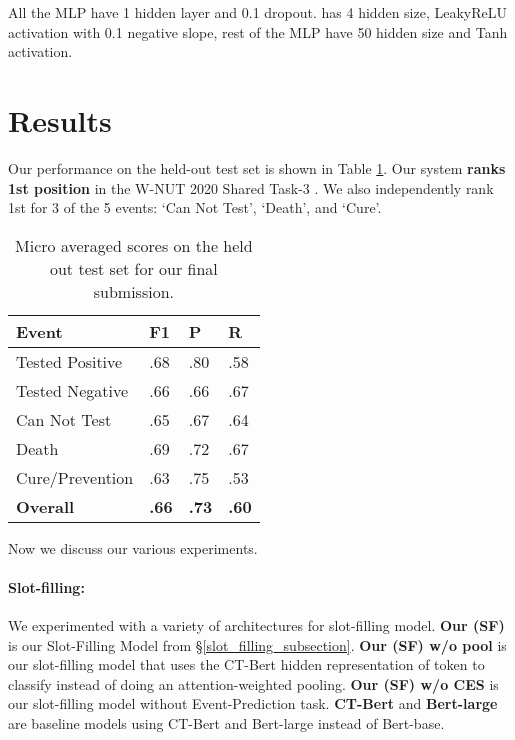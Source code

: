 \documentclass[11pt,a4paper]{article}
\begin{document}
All the MLP have 1 hidden layer and 0.1 dropout.  has 4 hidden size, LeakyReLU activation \cite{Maas13rectifiernonlinearities} with 0.1 negative slope, rest of the MLP have 50 hidden size and Tanh activation.



\section{Results}

Our performance on the held-out test set is shown in Table \ref{Table3:}. Our system \textbf{ranks 1st position} in the W-NUT 2020 Shared Task-3 \cite{zong2020extracting}. We also independently rank 1st for 3 of the 5 events: `Can Not Test', `Death', and `Cure'.




\begin{table}
 \begin{center}
  \begin{tabular}{p{2.5cm}|p{0.5cm}p{0.5cm}p{0.5cm}}
   \hline
   \textbf{Event} & \textbf{F1} & \textbf{P} & \textbf{R}\\ 
   \hline
   Tested Positive & .68 & .80 & .58 \\
   Tested Negative & .66 & .66 & .67 \\
   Can Not Test  & .65 & .67 & .64 \\
   Death           & .69 & .72 & .67 \\
   Cure/Prevention & .63 & .75 & .53 \\
   \hline
   \hline
   \textbf{Overall}         & \textbf{.66} & \textbf{.73} & \textbf{.60} \\
   \hline
  \end{tabular}
  \caption{\label{Table3:} Micro averaged scores on the held out test set for our final submission.}
 \end{center}
\end{table}

Now we discuss our various experiments.

\paragraph{Slot-filling:}

We experimented with a variety of architectures for slot-filling model. \textbf{Our (SF)} is our Slot-Filling Model from \S\ref{slot_filling_subsection}. \textbf{Our (SF) w/o pool} is our slot-filling model that uses the CT-Bert hidden representation of token  to classify instead of doing an attention-weighted pooling. \textbf{Our (SF) w/o CES} is our slot-filling model without Event-Prediction task. \textbf{CT-Bert} and \textbf{Bert-large} are baseline models using CT-Bert and Bert-large instead of Bert-base.
\end{document}
